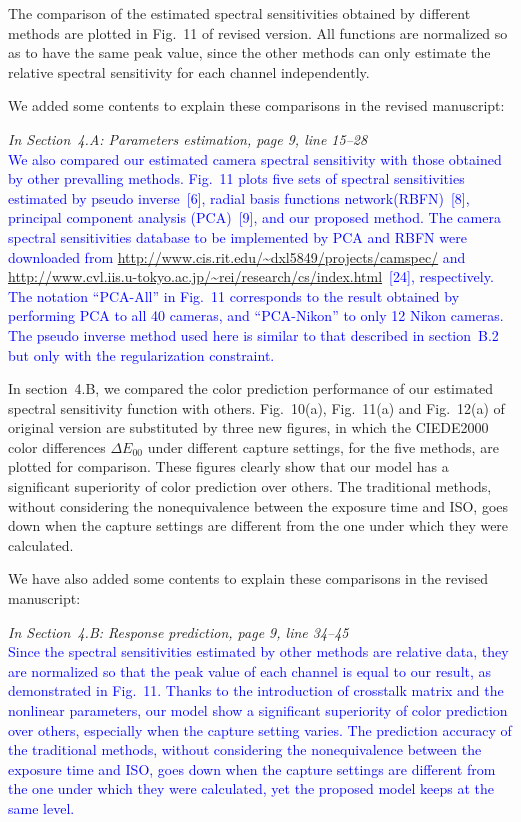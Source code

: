 \documentclass[12pt]{article}
\newcommand{\add}[1]{\noindent\textcolor{blue}{#1}}
\newcommand{\pos}[1]{\noindent\emph{\small#1}}
\begin{document}
{		The comparison of the estimated spectral sensitivities obtained by different methods are plotted in Fig.~11 of revised version. All functions are normalized so as to have the same peak value, since the other methods can only estimate the relative spectral sensitivity for each channel independently.
		
		We added some contents to explain these comparisons in the revised manuscript:
		
		\pos{In Section~4.A: Parameters estimation, page 9, line 15--28}\\
		\add{We also compared our estimated camera spectral sensitivity with those obtained by other prevalling methods. Fig.~11 plots five sets of spectral sensitivities estimated by pseudo inverse~[6], radial basis functions network(RBFN)~[8], principal component analysis (PCA)~[9], and our proposed method. The camera spectral sensitivities database to be implemented by PCA and RBFN were downloaded from \url{http://www.cis.rit.edu/~dxl5849/projects/camspec/} and \url{http://www.cvl.iis.u-tokyo.ac.jp/~rei/research/cs/index.html}~[24], respectively. The notation ``PCA-All'' in Fig.~11 corresponds to the result obtained by performing PCA to all 40 cameras, and ``PCA-Nikon'' to only 12 Nikon cameras. The pseudo inverse method used here is similar to that described in section~B.2 but only with the regularization constraint.}
		
		In section~4.B, we compared the color prediction performance of our estimated spectral sensitivity function with others. Fig.~10(a), Fig.~11(a) and Fig.~12(a) of original version are substituted by three new figures, in which the CIEDE2000 color differences $\Delta{}E_{00}$ under different capture settings, for the five methods, are plotted for comparison. These figures clearly show that our model has a significant superiority of color prediction over others. The traditional methods, without considering the nonequivalence between the exposure time and ISO, goes down when the capture settings are different from the one under which they were calculated.
		
		We have also added some contents to explain these comparisons in the revised manuscript:
		
		\pos{In Section~4.B: Response prediction, page 9, line 34--45}\\
		\add{Since the spectral sensitivities estimated by other methods are relative data, they are normalized so that the peak value of each channel is equal to our result, as demonstrated in Fig.~11. Thanks to the introduction of crosstalk matrix and the nonlinear parameters, our model show a significant superiority of color prediction over others, especially when the capture setting varies. The prediction accuracy of the traditional methods, without considering the nonequivalence between the exposure time and ISO, goes down when the capture settings are different from the one under which they were calculated, yet the proposed model keeps at the same level.}}
\end{document}
